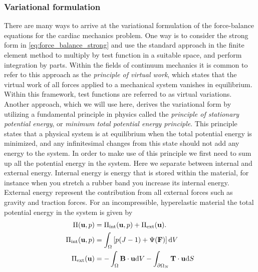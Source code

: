 \subsubsection{Variational formulation}
\label{sec:variational_formulation}
There are many ways to arrive at the variational formulation of the
force-balance equations for the cardiac mechanics problem.  One way is
to consider the strong form in \eqref{eq:force_balance_strong} and use
the standard approach in the finite element method to multiply by
test function in a suitable space, and perform integration by
parts. Within the fields of continuum mechanics it is common to
refer to this approach as the \emph{principle of virtual work}, which states
that the virtual work of all forces applied to a mechanical system
vanishes in equilibrium. Within this framework, test functions are
referred to as virtual variations.
Another approach, which we will use here, derives the variational form
by utilizing a fundamental principle in physics
called the \emph{principle of stationary potential energy}, or
\emph{minimum total potential energy principle}. This principle states that a
physical system is at equilibrium when the total potential energy is
minimized, and any infinitesimal changes from this state should not add
any energy to the system.
In order to make use of this principle we first need to sum up all the
potential energy in the system. Here we separate between internal and
external energy. Internal energy is energy that is stored within the
material, for instance when you stretch a rubber band you increase its
internal energy. External energy represent the contribution from all
external forces such as gravity and traction forces.
For an incompressible, hyperelastic material the total potential
energy in the system is given by
\begin{align}
  \Pi(\mathbf{u}, p) &= \Pi_{\mathrm{int}}(\mathbf{u},p) + \Pi_{\mathrm{ext}}(\mathbf{u}). \\
  \Pi_{\mathrm{int}}(\mathbf{u},p) &= \int_{\Omega} \left[ p(J - 1) +  \Psi(\mathbf{F}) \right] \mathrm{d}V\\
  \Pi_{\mathrm{ext}}(\mathbf{u}) &= - \int_{\Omega} \mathbf{B} \cdot \mathbf{u} \mathrm{d} V - \int_{\partial \Omega_N} \mathbf{T} \cdot \mathbf{u} \mathrm{d}S
\end{align}
